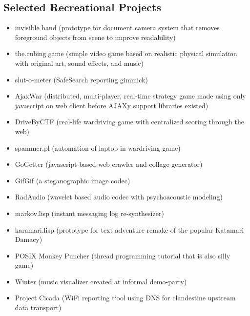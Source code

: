 \documentclass[12pt]{article}
\begin{document}
\subsection*{Selected Recreational Projects}
\begin{itemize}
  \item invisible hand (prototype for document camera system that removes foreground objects from scene to improve readability)
  \item the.cubing.game (simple video game based on realistic physical simulation with original art, sound effects, and music)
  \item slut-o-meter (SafeSearch reporting gimmick)
  \item AjaxWar (distributed, multi-player,  real-time strategy game made using only javascript on web client before AJAXy support libraries existed)
  \item DriveByCTF (real-life wardriving game with centralized scoring through the web)
  \item spammer.pl (automation of laptop in wardriving game)
  \item GoGetter (javascript-based web crawler and collage generator)
  \item GifGif (a steganographic image codec)
  \item RadAudio (wavelet based audio codec with psychoacoustic modeling)
  \item markov.lisp (instant messaging log re-synthesizer)
  \item karamari.lisp (prototype for text adventure remake of the popular Katamari Damacy)
  \item POSIX Monkey Puncher (thread programming tutorial that is also silly game)
  \item Winter (music visualizer created at informal demo-party)
  \item Project Cicada (WiFi reporting t`ool using DNS for clandestine upstream data transport)
\end{itemize}

\newpage
\end{document}
